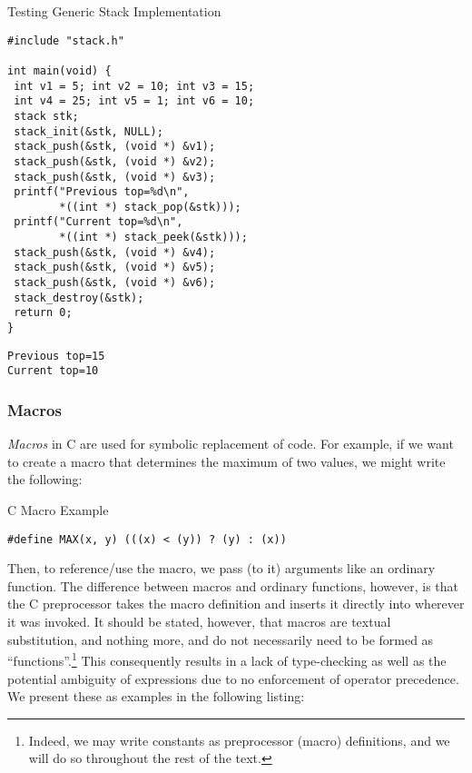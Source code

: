 \begin{cloast}[main.c]{Testing Generic Stack Implementation}
\begin{lstlisting}[language=MyC]
#include "stack.h"

int main(void) {
 int v1 = 5; int v2 = 10; int v3 = 15;
 int v4 = 25; int v5 = 1; int v6 = 10;
 stack stk;
 stack_init(&stk, NULL);
 stack_push(&stk, (void *) &v1);
 stack_push(&stk, (void *) &v2);
 stack_push(&stk, (void *) &v3);
 printf("Previous top=%d\n", 
        *((int *) stack_pop(&stk)));
 printf("Current top=%d\n", 
        *((int *) stack_peek(&stk)));
 stack_push(&stk, (void *) &v4);
 stack_push(&stk, (void *) &v5);
 stack_push(&stk, (void *) &v6);
 stack_destroy(&stk);
 return 0;
}
\end{lstlisting}
\tcblower
\begin{lstlisting}[language=MyOutput]
Previous top=15
Current top=10
\end{lstlisting}
\end{cloast}

\subsubsection*{Macros}
\textit{Macros} in C are used for symbolic replacement of code. For example, if we want to create a macro that determines the maximum of two values, we might write the following:

\begin{cl}[main.c]{C Macro Example}
\begin{lstlisting}[language=MyC]
#define MAX(x, y) (((x) < (y)) ? (y) : (x))
\end{lstlisting}
\end{cl}

Then, to reference/use the macro, we pass (to it) arguments like an ordinary function. The difference between macros and ordinary functions, however, is that the C preprocessor takes the macro definition and inserts it directly into wherever it was invoked. It should be stated, however, that macros are textual substitution, and nothing more, and do not necessarily need to be formed as ``functions''.\footnote{Indeed, we may write constants as preprocessor (macro) definitions, and we will do so throughout the rest of the text.} This consequently results in a lack of type-checking as well as the potential ambiguity of expressions due to no enforcement of operator precedence. We present these as examples in the following listing:

